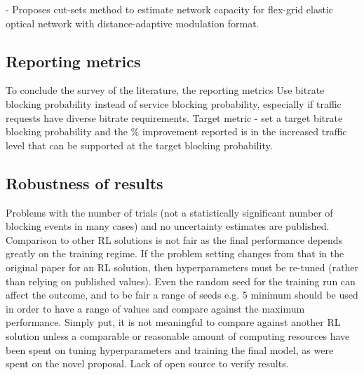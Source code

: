 \cite{cruzado_capacity-bound_2024} - Proposes cut-sets method to estimate network capacity for flex-grid elastic optical network with distance-adaptive modulation format. 




\subsection{Reporting metrics}
To conclude the survey of the literature, the reporting metrics 
Use bitrate blocking probability instead of service blocking probability, especially if traffic requests have diverse bitrate requirements.
Target metric - set a target bitrate blocking probability and the \% improvement reported is in the increased traffic level that can be supported at the target blocking probability.


\subsection{Robustness of results}
Problems with the number of trials (not a statistically significant number of blocking events in many cases) and no uncertainty estimates are published.
Comparison to other RL solutions is not fair as the final performance depends greatly on the training regime. If the problem setting changes from that in the original paper for an RL solution, then hyperparameters must be re-tuned (rather than relying on published values). Even the random seed for the training run can affect the outcome, and to be fair a range of seeds e.g. 5 minimum should be used in order to have a range of values and compare against the maximum performance. Simply put, it is not meaningful to compare against another RL solution unless a comparable or reasonable amount of computing resources have been spent on tuning hyperparameters and training the final model, as were spent on the novel proposal.
Lack of open source to verify results.
